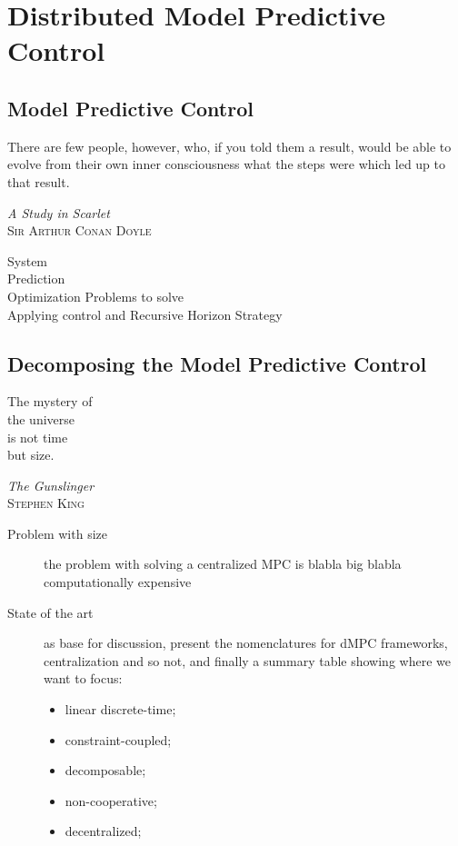 \documentclass[../main.tex]{subfiles}
\begin{document}
\part{Distributed Model Predictive Control}
\chapter{Model Predictive Control}
\epigraph{\centering There are few people, however, who, if you told them a result, would be able to evolve from their own inner consciousness what the steps were which led up to that result.}
{\textit{A Study in Scarlet}\\ \textsc{Sir Arthur Conan Doyle}}
\minitoc


\begin{description}
  \item[System]
  \item[Prediction]
  \item[Optimization Problems to solve]
  \item[Applying control and Recursive Horizon Strategy]
\end{description}

\printbibliography%


\chapter{Decomposing the Model Predictive Control}
\epigraph{\centering The mystery of \\ the universe \\ is not time\\ but size.}
{\textit{The Gunslinger}\\\textsc{Stephen King}}

\minitoc

\begin{description}
  \item[Problem with size] the problem with solving a centralized MPC is blabla big blabla computationally expensive
  \item[State of the art] \cite{ChristofidesEtAl2013,ArauzEtAl2021,NotarnicolaNotarstefano2020} as base for discussion,
        present the nomenclatures for dMPC frameworks, centralization and so not, and finally a summary table showing where we want to focus:
        \begin{itemize}
          \item linear discrete-time;
          \item constraint-coupled;
          \item decomposable;
          \item non-cooperative;
          \item decentralized;
        \end{itemize}

\end{description}
\end{document}
